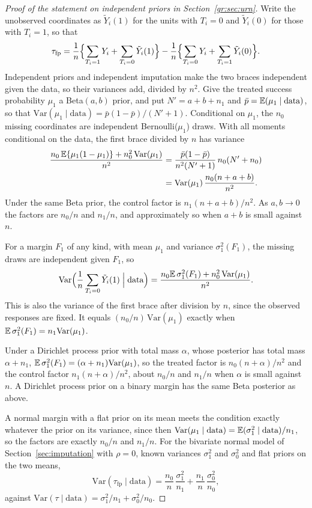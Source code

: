 \begin{proof}[Proof of the statement on independent priors in Section~\ref{gr:sec:urn}]
Write the unobserved coordinates as $\tilde Y_i(1)$ for the units with $T_i=0$ and $\tilde Y_i(0)$ for those with $T_i=1$, so that
\[
\tau_{\mathrm{fp}}=\frac1n\Bigl\{\sum_{T_i=1}Y_i+\sum_{T_i=0}\tilde Y_i(1)\Bigr\}-\frac1n\Bigl\{\sum_{T_i=0}Y_i+\sum_{T_i=1}\tilde Y_i(0)\Bigr\}.
\]
Independent priors and independent imputation make the two braces independent given the data, so their variances add, divided by $n^2$. Give the treated success probability $\mu_1$ a Beta$(a,b)$ prior, and put $N'=a+b+n_1$ and $\bar p=\mathbb{E}(\mu_1\mid\text{data})$, so that $\mathrm{Var}(\mu_1\mid\text{data})=\bar p(1-\bar p)/(N'+1)$. Conditional on $\mu_1$, the $n_0$ missing coordinates are independent Bernoulli($\mu_1$) draws. With all moments conditional on the data, the first brace divided by $n$ has variance
\begin{align*}
\frac{n_0\,\mathbb{E}\{\mu_1(1-\mu_1)\}+n_0^2\,\mathrm{Var}(\mu_1)}{n^2}&=\frac{\bar p(1-\bar p)}{n^2(N'+1)}\,n_0(N'+n_0)\\
&=\mathrm{Var}(\mu_1)\,\frac{n_0(n+a+b)}{n^2}.
\end{align*}
Under the same Beta prior, the control factor is $n_1(n+a+b)/n^2$. As $a,b\to0$ the factors are $n_0/n$ and $n_1/n$, and approximately so when $a+b$ is small against $n$.

For a margin $F_1$ of any kind, with mean $\mu_1$ and variance $\sigma_1^2(F_1)$, the missing draws are independent given $F_1$, so
\[
\mathrm{Var}\Bigl(\frac1n\sum_{T_i=0}\tilde Y_i(1)\Bigm|\text{data}\Bigr)=\frac{n_0\mathbb{E}\,\sigma_1^2(F_1)+n_0^2\,\mathrm{Var}(\mu_1)}{n^2}.
\]
This is also the variance of the first brace after division by $n$, since the observed responses are fixed. It equals $(n_0/n)\,\mathrm{Var}(\mu_1)$ exactly when $\mathbb{E}\,\sigma_1^2(F_1)=n_1\mathrm{Var}(\mu_1)$.

Under a Dirichlet process prior with total mass $\alpha$, whose posterior has total mass $\alpha+n_1$, $\mathbb{E}\,\sigma_1^2(F_1)=(\alpha+n_1)\mathrm{Var}(\mu_1)$, so the treated factor is $n_0(n+\alpha)/n^2$ and the control factor $n_1(n+\alpha)/n^2$, about $n_0/n$ and $n_1/n$ when $\alpha$ is small against $n$. A Dirichlet process prior on a binary margin has the same Beta posterior as above.

A normal margin with a flat prior on its mean meets the condition exactly whatever the prior on its variance, since then $\mathrm{Var}(\mu_1\mid\text{data})=\mathbb{E}(\sigma_1^2\mid\text{data})/n_1$, so the factors are exactly $n_0/n$ and $n_1/n$. For the bivariate normal model of Section~\ref{sec:imputation} with $\rho=0$, known variances $\sigma_1^2$ and $\sigma_0^2$ and flat priors on the two means,
\[
\mathrm{Var}(\tau_{\mathrm{fp}}\mid\text{data})=\frac{n_0}{n}\,\frac{\sigma_1^2}{n_1}+\frac{n_1}{n}\,\frac{\sigma_0^2}{n_0},
\]
against $\mathrm{Var}(\tau\mid\text{data})=\sigma_1^2/n_1+\sigma_0^2/n_0$.


\end{proof}
